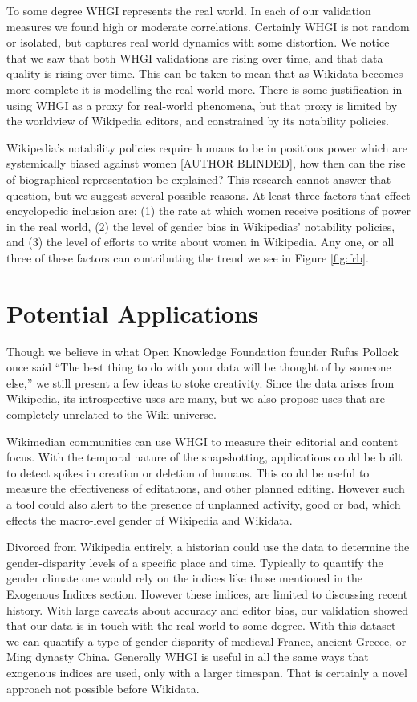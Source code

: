 \documentclass[letterpaper]{article}
\begin{document}
To some degree WHGI represents the real world. In each of our validation measures we found high or moderate correlations. Certainly WHGI is not random or isolated, but captures real world dynamics with some distortion. We notice that we saw that both WHGI validations are rising over time, and  that data quality is rising over time. This can be taken to mean that as Wikidata becomes more complete it is modelling the real world more. There is some justification in using WHGI as a proxy for real-world phenomena, but that proxy is limited by the worldview of Wikipedia editors, and constrained by its notability policies. 

Wikipedia's notability policies require humans to be in positions power which are systemically biased against women [AUTHOR BLINDED], how then can the rise of biographical representation be explained? This research cannot answer that question, but we suggest several possible reasons. At least three factors that effect encyclopedic inclusion are: (1) the rate at which women receive positions of power in the real world, (2) the level of gender bias in Wikipedias' notability policies, and (3) the level of efforts to write about women in Wikipedia. Any one, or all three of these factors can contributing the trend we see in Figure \ref{fig:frb}.

\section{Potential Applications}
Though we believe in what Open Knowledge Foundation founder Rufus Pollock once said ``The best thing to do with your data will be thought of by someone else,'' we still present a few ideas to stoke creativity. Since the data arises from Wikipedia, its introspective uses are many, but we also propose uses that are completely unrelated to the Wiki-universe. 

Wikimedian communities can use WHGI to measure their editorial and content focus. With the temporal nature of the snapshotting, applications could be built to detect spikes in creation or deletion of humans. This could be useful to measure the effectiveness of editathons, and other planned editing. However such a tool could also alert to the presence of unplanned activity, good or bad, which effects the macro-level gender of Wikipedia and Wikidata.

Divorced from Wikipedia entirely, a historian could use the data to determine the gender-disparity levels of a specific place and time. Typically to quantify the gender climate one would rely on the indices like those mentioned in the Exogenous Indices section. However these indices, are limited to discussing recent history. With large caveats about accuracy and editor bias, our validation showed that our data is in touch with the real world to some degree. With this dataset we can quantify a type of gender-disparity of medieval France, ancient Greece, or Ming dynasty China. Generally WHGI is useful in all the same ways that exogenous indices are used, only with a larger timespan. That is certainly a novel approach not possible before Wikidata.
\end{document}
